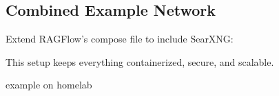 \documentclass[letterpaper,10pt,english]{sphinxmanual}
\begin{document}
\subsection{Combined Example Network}
\label{\detokenize{searxng:combined-example-network}}
\sphinxAtStartPar
Extend RAGFlow’s compose file to include SearXNG:

\begin{sphinxVerbatim}[commandchars=\\\{\}]
\end{sphinxVerbatim}

\sphinxAtStartPar
This setup keeps everything containerized, secure, and scalable.

\sphinxAtStartPar
example on homelab
\end{document}
